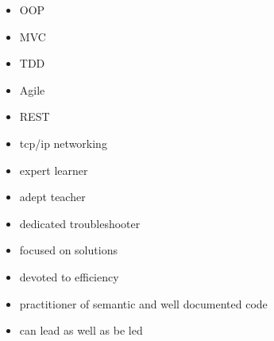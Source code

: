 \documentclass[letterpaper]{article}        %
\begin{document}
\begin{multicols}{3}
      \begin{itemize}
        \item OOP
        \item MVC
        \item TDD
        \item Agile
        \item REST
        \end{itemize}
    
      \begin{itemize}
            \end{itemize}
    
      \begin{itemize}
        \item tcp/ip networking
        \end{itemize}
    
      \begin{itemize}
            \end{itemize}
    
      \begin{itemize}
        \item expert learner
        \item adept teacher
        \item dedicated troubleshooter
        \item focused on solutions
        \item devoted to efficiency
        \item practitioner of semantic and well documented code
        \item can lead as well as be led
        \end{itemize}
    

\end{multicols}
\end{document}
